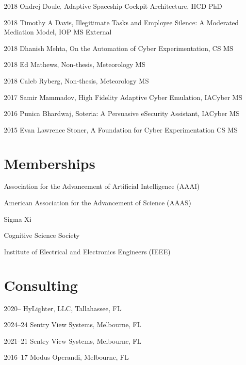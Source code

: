 \documentclass[12pt,letterpaper]{report}
\newcommand{\listitemspace}{0.25em}
\renewenvironment{itemize}
{\begin{list}{}{\setlength{\leftmargin}{0em}
                \setlength{\parskip}{0em}
                \setlength{\itemsep}{\listitemspace}
                \setlength{\parsep}{\listitemspace}}}
{\end{list}}
\begin{document}
\begin{itemize}
    \item 2018 Ondrej Doule, Adaptive Spaceship Cockpit Architecture, HCD PhD    
    \item 2018 Timothy A Davis, Illegitimate Tasks and Employee Silence: A Moderated Mediation Model, IOP MS External
    \item 2018 Dhanish Mehta, On the Automation of Cyber Experimentation, CS MS
    \item 2018 Ed Mathews, Non-thesis, Meteorology MS
    \item 2018 Caleb Ryberg, Non-thesis, Meteorology MS
    \item 2017 Samir Mammadov, High Fidelity Adaptive Cyber Emulation, IACyber MS
    \item 2016 Punica Bhardwaj, Soteria: A Persuasive eSecurity Assistant, IACyber MS
    \item 2015 Evan Lawrence Stoner, A Foundation for Cyber Experimentation CS MS

    \end{itemize}

    \section*{Memberships}

    \begin{itemize}

        \item Association for the Advancement of Artificial Intelligence (AAAI)
        \item American Association for the Advancement of Science (AAAS)
        \item Sigma Xi
        \item Cognitive Science Society
        \item Institute of Electrical and Electronics Engineers (IEEE)
    \end{itemize}



    \section*{Consulting}

    \begin{tablist}
        \item[2020--  ] \tab{}HyLighter, LLC, Tallahassee, FL
        \item[2024--24] \tab{}Sentry View Systems, Melbourne, FL
        \item[2021--21] \tab{}Sentry View Systems, Melbourne, FL
        \item[2016--17] \tab{}Modus Operandi, Melbourne, FL
    \end{tablist}
\end{document}
